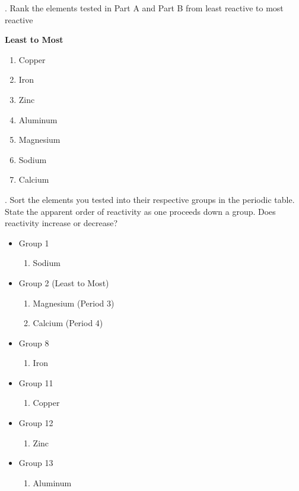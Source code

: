 \documentclass[12pt]{article}
\begin{document}
    \normalsize
    \bigskip
    . Rank the elements tested in Part A and Part B from least reactive to most reactive

    \begin{multicols}{2}
        \medskip
        \noindent\textbf{Least to Most}
        \begin{enumerate}
            \item Copper
            \item Iron
            \item Zinc
            \item Aluminum
            \item Magnesium
            \item Sodium
            \item Calcium
        \end{enumerate}
    \end{multicols}

    \medskip
    . Sort the elements you tested into their respective groups in the periodic table. State the apparent order of reactivity as one proceeds down a group. Does reactivity increase or decrease? 
    \begin{multicols}{2}
        \begin{itemize}
            \item Group 1
            \begin{enumerate}
                \item Sodium
            \end{enumerate}
            \item Group 2 (Least to Most)
            \begin{enumerate}
                \item Magnesium (Period 3)
                \item Calcium (Period 4)
            \end{enumerate}
            \item Group 8
            \begin{enumerate}
                \item Iron
            \end{enumerate}
            \item Group 11
            \begin{enumerate}
                \item Copper
            \end{enumerate}
            \item Group 12
            \begin{enumerate}
                \item Zinc
            \end{enumerate}
            \item Group 13
            \begin{enumerate}
                \item Aluminum
            \end{enumerate}
        \end{itemize}
    \end{multicols}
    
\end{document}
